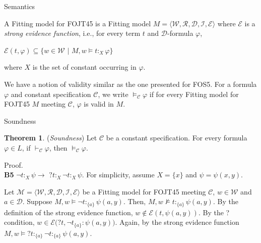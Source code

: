 \documentclass{beamer}
\theoremstyle{definition}
\newtheorem{teor}{Theorem}
\newcommand{\C}{\mathcal{C}}
\newcommand{\D}{\mathcal{D}}
\newcommand{\W}{\mathcal{W}}
\newcommand{\R}{\mathcal{R}}
\newcommand{\M}{\mathcal{M}}
\newcommand{\E}{\mathcal{E}}
\newcommand{\I}{\mathcal{I}}
\newcommand{\Fmodel}{\bl\W,\R,\D,\I,\E \br}
\newcommand{\nmodels}{\not\models}
\newcommand{\nao}{\neg}
\newcommand{\impli}{\rightarrow}
\newcommand{\teo}{\vdash}
\newcommand{\bl}{\langle}
\newcommand{\br}{\rangle}
\begin{document}
\begin{frame}{Semantics}	


	
\qquad A {\color{blue}Fitting model for FOJT45} is a Fitting model $M = \Fmodel$ where $\E$ is a \textit{strong evidence function}, i.e., for every term $t$ and $\D$-formula $\varphi$, 

\begin{center}
$\E(t,\varphi) \subseteq \{w \in \W$ $|$ $ M,w \models t$$:_{X}$$\varphi\}$
\end{center}


where $X$ is the set of constant occurring in $\varphi$.	
\vspace{5mm}


\qquad We have a notion of validity similar as the one presented for FOS5. For a formula $\varphi$ and constant specification $\C$, we write $\models_{\C}\varphi$ if for every Fitting model for FOJT45 $M$ meeting $\C$, $\varphi$ is valid in $M$.
\end{frame}
	
\begin{frame}{Soundness}

\begin{teor}
	(\textit{Soundness}) Let $\C$ be a constant specification. For every formula $\varphi \in L$, if $\teo_{\C} \varphi$, then $\models_{\C}\varphi$.
\end{teor}	

{\color{blue} Proof.}\\	
\textbf{B5} $\nao t$$:_{X}$$\psi \impli$ $?t$$:_{X}$$\nao t$$:_{X}$$\psi$. For simplicity, assume $X= \{x\}$ and $\psi = \psi(x,y)$.\\
\vspace{5mm}
	
\qquad Let $\M = \Fmodel$ be a Fitting model for FOJT45 meeting $\C$, $w \in \W$ and $a \in \D$. Suppose $M, w \models \nao t$$:_{\{a\}}$$\psi(a,y)$. Then, $M, w \nmodels t$$:_{\{a\}}$$\psi(a,y)$. By the definition of the strong evidence function, $w \notin \E (t, \psi(a,y))$. By the ? condition, $w \in \E(?t,\nao t_{\{a\}}$$:\psi(a,y))$. Again, by the strong evidence function $M, w \models ?t$$:_{\{a\}}$$\nao t$$:_{\{a\}}$$\psi(a,y)$.
	
\end{frame}
\end{document}

